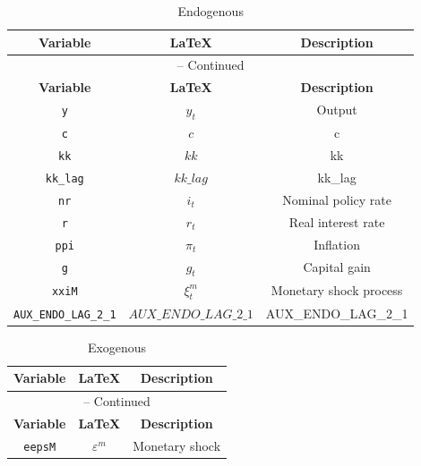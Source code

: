\begin{center}
\begin{longtable}{ccc}
\caption{Endogenous}\\%
\hline%
\multicolumn{1}{c}{\textbf{Variable}} &
\multicolumn{1}{c}{\textbf{\LaTeX}} &
\multicolumn{1}{c}{\textbf{Description}}\\%
\hline\hline%
\endfirsthead
\multicolumn{3}{c}{{\tablename} \thetable{} -- Continued}\\%
\hline%
\multicolumn{1}{c}{\textbf{Variable}} &
\multicolumn{1}{c}{\textbf{\LaTeX}} &
\multicolumn{1}{c}{\textbf{Description}}\\%
\hline\hline%
\endhead
\texttt{y} & $y_t$ & Output\\
\texttt{c} & $c$ & c\\
\texttt{kk} & $kk$ & kk\\
\texttt{kk\_lag} & $kk\_lag$ & kk\_lag\\
\texttt{nr} & $i_t$ & Nominal policy rate\\
\texttt{r} & $r_t$ & Real interest rate\\
\texttt{ppi} & $\pi_t$ & Inflation\\
\texttt{g} & $g_t$ & Capital gain\\
\texttt{xxiM} & $\xi^m_t$ & Monetary shock process\\
\texttt{AUX\_ENDO\_LAG\_2\_1} & $AUX\_ENDO\_LAG\_2\_1$ & AUX\_ENDO\_LAG\_2\_1\\
\hline%
\end{longtable}
\end{center}
\begin{center}
\begin{longtable}{ccc}
\caption{Exogenous}\\%
\hline%
\multicolumn{1}{c}{\textbf{Variable}} &
\multicolumn{1}{c}{\textbf{\LaTeX}} &
\multicolumn{1}{c}{\textbf{Description}}\\%
\hline\hline%
\endfirsthead
\multicolumn{3}{c}{{\tablename} \thetable{} -- Continued}\\%
\hline%
\multicolumn{1}{c}{\textbf{Variable}} &
\multicolumn{1}{c}{\textbf{\LaTeX}} &
\multicolumn{1}{c}{\textbf{Description}}\\%
\hline\hline%
\endhead
\texttt{eepsM} & ${\varepsilon^{m}}$ & Monetary shock\\
\hline%
\end{longtable}
\end{center}

